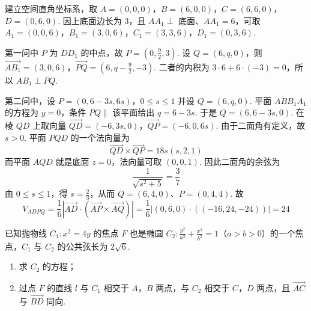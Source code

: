 \begin{solution}
建立空间直角坐标系，取
\(A=(0,0,0)\)，\(B=(6,0,0)\)，\(C=(6,6,0)\)，\(D=(0,6,0)\).
因上底面边长为 \(3\)，且 \(AA_1\perp\) 底面、\(AA_1=6\)，可取
\(A_1=(0,0,6)\)，\(B_1=(3,0,6)\)，\(C_1=(3,3,6)\)，\(D_1=(0,3,6)\).

第一问中 \(P\) 为 \(DD_1\) 的中点，故 \(P=(0,\frac{9}{2},3)\). 设 \(Q=(6,q,0)\)，则
\(\overrightarrow{AB_1}=(3,0,6)\)，\(\overrightarrow{PQ}=(6,q-\frac{9}{2},-3)\).
二者的内积为 \(3\cdot6+6\cdot(-3)=0\)，所以 \(AB_1\perp PQ\).

第二问中，设
\(P=(0,6-3s,6s)\)，\(0\leqslant s\leqslant1\)
并设 \(Q=(6,q,0)\). 平面 \(ABB_1A_1\) 的方程为 \(y=0\)，条件 \(PQ\parallel\) 该平面给出 \(q=6-3s\). 于是 \(Q=(6,6-3s,0)\). 在棱 \(QD\) 上取向量
\(\overrightarrow{QD}=(-6,3s,0)\)，\(\overrightarrow{QP}=(-6,0,6s)\).
由于二面角有定义，故 \(s>0\). 平面 \(PQD\) 的一个法向量为
\[
\overrightarrow{QD}\times\overrightarrow{QP}
=18s(s,2,1)
\]
而平面 \(AQD\) 就是底面 \(z=0\)，法向量可取 \((0,0,1)\). 因此二面角的余弦为
\[
\frac{1}{\sqrt{s^2+5}}=\frac37
\]
由 \(0\leqslant s\leqslant1\)，得 \(s=\frac{2}{3}\)，从而 \(Q=(6,4,0)\)、\(P=(0,4,4)\). 故
\[
V_{ADPQ}=\frac16\left|\overrightarrow{AD}\cdot
\left(\overrightarrow{AP}\times\overrightarrow{AQ}\right)\right|
=\frac16\left|(0,6,0)\cdot((-16,24,-24))\right|=24
\]
\end{solution}

\begin{problem}
已知抛物线 \(C_1: x^2 = 4y\) 的焦点 \(F\) 也是椭圆 \(C_2: \frac{y^2}{a^2} + \frac{x^2}{b^2} = 1\)（\(a > b > 0\)）的一个焦点，\(C_1\) 与 \(C_2\) 的公共弦长为 \(2\sqrt{6}\).

\begin{enumerate}
\item 求 \(C_{2}\) 的方程；
\item 过点 \(F\) 的直线 \(l\) 与 \(C_1\) 相交于 \(A\)，\(B\) 两点，与 \(C_2\) 相交于 \(C\)，\(D\) 两点，且 \(\overrightarrow{AC}\) 与 \(\overrightarrow{BD}\) 同向.
\end{enumerate}
\end{problem}

